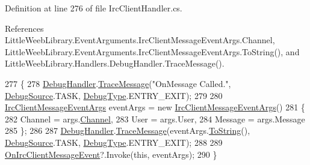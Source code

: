 Definition at line 276 of file Irc\+Client\+Handler.\+cs.



References Little\+Weeb\+Library.\+Event\+Arguments.\+Irc\+Client\+Message\+Event\+Args.\+Channel, Little\+Weeb\+Library.\+Event\+Arguments.\+Irc\+Client\+Message\+Event\+Args.\+To\+String(), and Little\+Weeb\+Library.\+Handlers.\+Debug\+Handler.\+Trace\+Message().


\begin{DoxyCode}
277         \{
278             \mbox{\hyperlink{class_little_weeb_library_1_1_handlers_1_1_irc_client_handler_ab50ece494948d25db1839f4d6eab038f}{DebugHandler}}.\mbox{\hyperlink{interface_little_weeb_library_1_1_handlers_1_1_i_debug_handler_a2e405bc3492e683cd3702fae125221bc}{TraceMessage}}(\textcolor{stringliteral}{"OnMessage Called."}, 
      \mbox{\hyperlink{namespace_little_weeb_library_1_1_handlers_a2a6ca0775121c9c503d58aa254d292be}{DebugSource}}.TASK, \mbox{\hyperlink{namespace_little_weeb_library_1_1_handlers_ab66019ed40462876ec4e61bb3ccb0a62}{DebugType}}.ENTRY\_EXIT);
279 
280             \mbox{\hyperlink{class_little_weeb_library_1_1_event_arguments_1_1_irc_client_message_event_args}{IrcClientMessageEventArgs}} eventArgs = \textcolor{keyword}{new} 
      \mbox{\hyperlink{class_little_weeb_library_1_1_event_arguments_1_1_irc_client_message_event_args}{IrcClientMessageEventArgs}}()
281             \{
282                 Channel = args.\mbox{\hyperlink{class_little_weeb_library_1_1_event_arguments_1_1_irc_client_message_event_args_a89968e57254aa26cf1d41fa7a967ec61}{Channel}},
283                 User = args.User,
284                 Message = args.Message
285             \};
286 
287             \mbox{\hyperlink{class_little_weeb_library_1_1_handlers_1_1_irc_client_handler_ab50ece494948d25db1839f4d6eab038f}{DebugHandler}}.\mbox{\hyperlink{interface_little_weeb_library_1_1_handlers_1_1_i_debug_handler_a2e405bc3492e683cd3702fae125221bc}{TraceMessage}}(eventArgs.\mbox{\hyperlink{class_little_weeb_library_1_1_event_arguments_1_1_irc_client_message_event_args_a0b8df2a044d27dec2dd963e978311be4}{ToString}}(), 
      \mbox{\hyperlink{namespace_little_weeb_library_1_1_handlers_a2a6ca0775121c9c503d58aa254d292be}{DebugSource}}.TASK, \mbox{\hyperlink{namespace_little_weeb_library_1_1_handlers_ab66019ed40462876ec4e61bb3ccb0a62}{DebugType}}.ENTRY\_EXIT);
288 
289             \mbox{\hyperlink{class_little_weeb_library_1_1_handlers_1_1_irc_client_handler_a60906730beb3dae974b2bdc77a51bb8d}{OnIrcClientMessageEvent}}?.Invoke(\textcolor{keyword}{this}, eventArgs);
290         \}
\end{DoxyCode}
